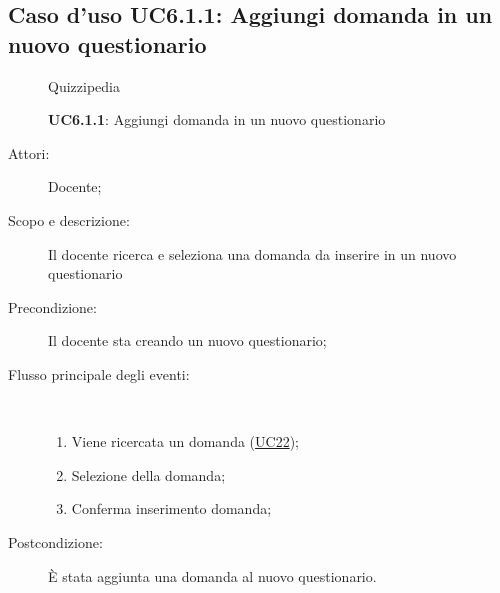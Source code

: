 \subsection{Caso d'uso UC6.1.1: Aggiungi domanda in un nuovo questionario }
	\begin{figure}[H]
		\centering
		\begin{resizedtikzpicture}{\textwidth}
		\begin{umlsystem}[x=0, fill=lightgray!20]{Quizzipedia}
		\end{umlsystem}
		\end{resizedtikzpicture}
		\caption{\textbf{UC6.1.1}: Aggiungi domanda in un nuovo questionario }
		\label{UC6.1.1}
	\end{figure}
\begin{description}
\item[Attori:] Docente;
\item[Scopo e descrizione:] Il docente ricerca e seleziona una domanda da inserire in un nuovo questionario
      \item[Precondizione:] Il docente sta creando un nuovo questionario;

        \item[Flusso principale degli eventi:] \ 
 \begin{enumerate}
          \item Viene ricercata un domanda (\hyperlink{UC22}{UC22});
          \item Selezione della domanda;
          \item Conferma inserimento domanda;

      \end{enumerate}
    \item[Postcondizione:] È stata aggiunta una domanda al nuovo questionario.
  \end{description}
\hypertarget{UC6.1.2}{}
